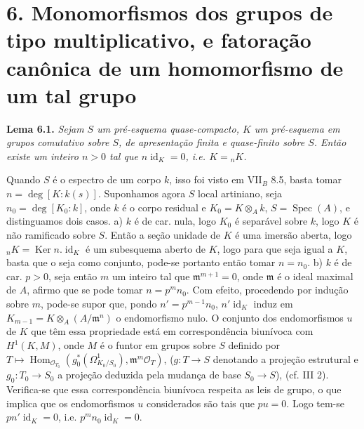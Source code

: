 

\section*{6. Monomorfismos dos grupos de tipo multiplicativo, e
fatoração canônica de um homomorfismo de um tal grupo}

\medskip
\noindent{}\textbf{Lema 6.1.}
\textit{Sejam \(S\) um pré-esquema quase-compacto, \(K\) um
pré-esquema em grupos comutativo sobre \(S\), de apresentação
finita e quase-finito sobre \(S\). Então existe um inteiro
\(n>0\) tal que \(n\operatorname{id}_K=0\), i.e. \(K={}_nK\).}

Quando \(S\) é o espectro de um corpo \(k\), isso foi visto
em VII\(_B\) 8.5, basta tomar \(n=\deg[K:k(s)]\).
Suponhamos agora \(S\) local artiniano, seja
\(n_0=\deg[K_0:k]\), onde \(k\) é o corpo residual e
\(K_0=K\otimes_Ak\), \(S=\operatorname{Spec}(A)\), e
distinguamos dois casos.
a) \(k\) é de
car. nula, logo \(K_0\) é separável sobre \(k\), logo \(K\)
é não ramificado sobre \(S\). Então a seção unidade de \(K\)
é uma imersão aberta, logo
\({}_nK=\operatorname{Ker}n.\operatorname{id}_K\) é um
subesquema aberto de \(K\), logo para que seja igual a \(K\),
basta que o seja como conjunto, pode-se portanto então tomar
\(n=n_0\).
b) \(k\) é de
car. \(p>0\), seja então \(m\) um inteiro tal que
\(\mathfrak m^{m+1}=0\), onde \(\mathfrak m\) é o ideal
maximal de \(A\), afirmo que se pode tomar \(n=p^mn_0\).
Com efeito, procedendo por indução sobre \(m\), pode-se supor
que, pondo \(n'=p^{m-1}n_0\), \(n'\operatorname{id}_K\)
induz em \(K_{m-1}=K\otimes_A(A/\mathfrak m^n)\) o
endomorfismo nulo. O conjunto dos endomorfismos \(u\) de
\(K\) que têm essa propriedade está em correspondência
biunívoca com \(H^1(K,M)\), onde \(M\) é o funtor em grupos
sobre \(S\) definido por
%
\(T\mapsto\operatorname{Hom}_{\mathscr O_{T_0}}
(g_0^*(\Omega^1_{K_0/S_0}),\mathfrak m^m\mathscr O_T)\),
(\(g:T\to S\) denotando a projeção estrutural e
\(g_0:T_0\to S_0\) a projeção deduzida pela mudança de base
\(S_0\to S\)), (cf. III 2). Verifica-se que essa
correspondência biunívoca respeita as leis de grupo, o que
implica que os endomorfismos \(u\) considerados são tais
que \(pu=0\). Logo tem-se \(pn'\operatorname{id}_K=0\),
i.e. \(p^mn_0\operatorname{id}_K=0\).

